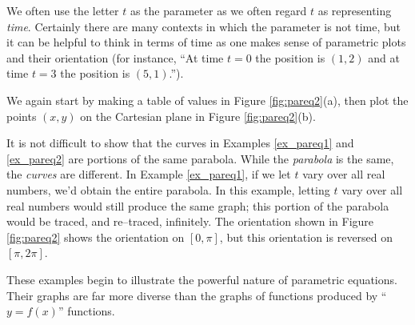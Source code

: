 We often use the letter $t$ as the parameter as we often regard $t$ as representing \textit{time}. Certainly there are many contexts in which the parameter is not time, but it can be helpful to think in terms of time as one makes sense of parametric plots and their orientation (for instance, ``At time $t=0$ the position is $(1,2)$ and at time $t=3$ the position is $(5,1)$.'').
\\

{We again start by making a table of values in Figure \ref{fig:pareq2}(a), then plot the points $(x,y)$ on the Cartesian plane in Figure \ref{fig:pareq2}(b).

It is not difficult to show that the curves in Examples \ref{ex_pareq1} and \ref{ex_pareq2} are portions of the same parabola. While the \textit{parabola} is the same, the \textit{curves} are different. In Example \ref{ex_pareq1}, if we let $t$ vary over all real numbers, we'd obtain the entire parabola. In this example, letting $t$ vary over all real numbers would still produce the same graph; this portion of the parabola would be traced, and re--traced, infinitely. The orientation shown in Figure \ref{fig:pareq2} shows the orientation on $[0,\pi]$, but this orientation is reversed on $[\pi,2\pi]$.

These examples begin to illustrate the powerful nature of parametric equations. Their graphs are far more diverse than the graphs of functions produced by ``$y=f(x)$'' functions.
}\\

